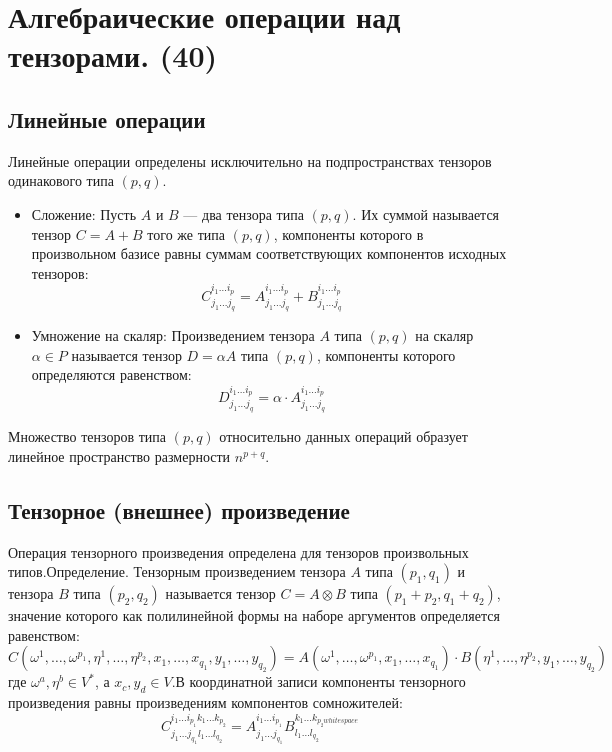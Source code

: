 \documentclass[14pt]{extreport}
\begin{document}
    \chapter{Алгебраические операции над тензорами. (40)}
    \section{Линейные операции}
    Линейные операции определены исключительно на подпространствах тензоров одинакового типа $(p, q)$.
    \begin{itemize}
        \item Сложение: Пусть $A$ и $B$ — два тензора типа $(p, q)$. Их суммой называется тензор $C = A + B$ того же типа $(p, q)$, компоненты которого в произвольном базисе равны суммам соответствующих компонентов исходных тензоров:$$C^{i_1 \dots i_p}_{j_1 \dots j_q} = A^{i_1 \dots i_p}_{j_1 \dots j_q} + B^{i_1 \dots i_p}_{j_1 \dots j_q}$$
        \item Умножение на скаляр: Произведением тензора $A$ типа $(p, q)$ на скаляр $\alpha \in P$ называется тензор $D = \alpha A$ типа $(p, q)$, компоненты которого определяются равенством:$$D^{i_1 \dots i_p}_{j_1 \dots j_q} = \alpha \cdot A^{i_1 \dots i_p}_{j_1 \dots j_q}$$
    \end{itemize}

    Множество тензоров типа $(p, q)$ относительно данных операций образует линейное пространство размерности $n^{p+q}$.

    \section{Тензорное (внешнее) произведение}
    Операция тензорного произведения определена для тензоров произвольных типов.Определение. Тензорным произведением тензора $A$ типа $(p_1, q_1)$ и тензора $B$ типа $(p_2, q_2)$ называется тензор $C = A \otimes B$ типа $(p_1 + p_2, q_1 + q_2)$, значение которого как полилинейной формы на наборе аргументов определяется равенством:$$C(\omega^1, \dots, \omega^{p_1}, \eta^1, \dots, \eta^{p_2}, x_1, \dots, x_{q_1}, y_1, \dots, y_{q_2}) = A(\omega^1, \dots, \omega^{p_1}, x_1, \dots, x_{q_1}) \cdot B(\eta^1, \dots, \eta^{p_2}, y_1, \dots, y_{q_2})$$где $\omega^a, \eta^b \in V^*$, а $x_c, y_d \in V$.В координатной записи компоненты тензорного произведения равны произведениям компонентов сомножителей:$$C^{i_1 \dots i_{p_1} k_1 \dots k_{p_2}}_{j_1 \dots j_{q_1} l_1 \dots l_{q_2}} = A^{i_1 \dots i_{p_1}}_{j_1 \dots j_{q_1}} B^{k_1 \dots k_{p_2whitespace} }_{l_1 \dots l_{q_2}}$$
\end{document}
